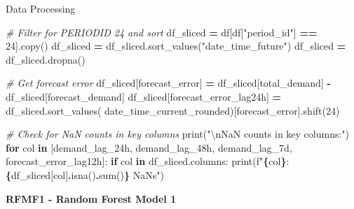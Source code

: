 \documentclass[mstat,12pt]{unswthesis}
\newenvironment{Shaded}{\begin{snugshade}}{\end{snugshade}}
\newcommand{\BuiltInTok}[1]{#1}
\newcommand{\CharTok}[1]{\textcolor[rgb]{0.31,0.60,0.02}{#1}}
\newcommand{\CommentTok}[1]{\textcolor[rgb]{0.56,0.35,0.01}{\textit{#1}}}
\newcommand{\ControlFlowTok}[1]{\textcolor[rgb]{0.13,0.29,0.53}{\textbf{#1}}}
\newcommand{\DecValTok}[1]{\textcolor[rgb]{0.00,0.00,0.81}{#1}}
\newcommand{\KeywordTok}[1]{\textcolor[rgb]{0.13,0.29,0.53}{\textbf{#1}}}
\newcommand{\NormalTok}[1]{#1}
\newcommand{\OperatorTok}[1]{\textcolor[rgb]{0.81,0.36,0.00}{\textbf{#1}}}
\newcommand{\SpecialCharTok}[1]{\textcolor[rgb]{0.81,0.36,0.00}{\textbf{#1}}}
\newcommand{\SpecialStringTok}[1]{\textcolor[rgb]{0.31,0.60,0.02}{#1}}
\newcommand{\StringTok}[1]{\textcolor[rgb]{0.31,0.60,0.02}{#1}}
\begin{document}
\noindent Data Processing

\begin{Shaded}
\begin{Highlighting}[]
\CommentTok{\# Filter for PERIODID 24 and sort}
\NormalTok{df\_sliced }\OperatorTok{=}\NormalTok{ df[df[}\StringTok{"period\_id"}\NormalTok{] }\OperatorTok{==} \DecValTok{24}\NormalTok{].copy()}
\NormalTok{df\_sliced }\OperatorTok{=}\NormalTok{ df\_sliced.sort\_values(}\StringTok{"date\_time\_future"}\NormalTok{)}
\NormalTok{df\_sliced }\OperatorTok{=}\NormalTok{ df\_sliced.dropna()}

\CommentTok{\# Get forecast error}
\NormalTok{df\_sliced[}\StringTok{\textquotesingle{}forecast\_error\textquotesingle{}}\NormalTok{] }\OperatorTok{=}\NormalTok{ df\_sliced[}\StringTok{\textquotesingle{}total\_demand\textquotesingle{}}\NormalTok{] }\OperatorTok{{-}} 
\NormalTok{    df\_sliced[}\StringTok{\textquotesingle{}forecast\_demand\textquotesingle{}}\NormalTok{]}
\NormalTok{df\_sliced[}\StringTok{\textquotesingle{}forecast\_error\_lag24h\textquotesingle{}}\NormalTok{] }\OperatorTok{=}\NormalTok{ df\_sliced.sort\_values(}
      \StringTok{\textquotesingle{}date\_time\_current\_rounded\textquotesingle{}}\NormalTok{)[}\StringTok{\textquotesingle{}forecast\_error\textquotesingle{}}\NormalTok{].shift(}\DecValTok{24}\NormalTok{)}

\CommentTok{\# Check for NaN counts in key columns}
\BuiltInTok{print}\NormalTok{(}\StringTok{"}\CharTok{\textbackslash{}n}\StringTok{NaN counts in key columns:"}\NormalTok{)}
\ControlFlowTok{for}\NormalTok{ col }\KeywordTok{in}\NormalTok{ [}\StringTok{\textquotesingle{}demand\_lag\_24h\textquotesingle{}}\NormalTok{, }\StringTok{\textquotesingle{}demand\_lag\_48h\textquotesingle{}}\NormalTok{, }\StringTok{\textquotesingle{}demand\_lag\_7d\textquotesingle{}}\NormalTok{, }
    \StringTok{\textquotesingle{}forecast\_error\_lag12h\textquotesingle{}}\NormalTok{]:}
    \ControlFlowTok{if}\NormalTok{ col }\KeywordTok{in}\NormalTok{ df\_sliced.columns:}
        \BuiltInTok{print}\NormalTok{(}\SpecialStringTok{f"}\SpecialCharTok{\{}\NormalTok{col}\SpecialCharTok{\}}\SpecialStringTok{: }\SpecialCharTok{\{}\NormalTok{df\_sliced[col]}\SpecialCharTok{.}\NormalTok{isna()}\SpecialCharTok{.}\BuiltInTok{sum}\NormalTok{()}\SpecialCharTok{\}}\SpecialStringTok{ NaNs"}\NormalTok{)}
\end{Highlighting}
\end{Shaded}

\noindent \textbf{RFMF1 - Random Forest Model 1}
\end{document}
